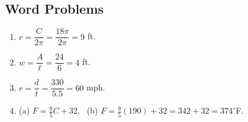 \documentclass[11pt]{article}
\begin{document}
\subsection*{Word Problems}
\begin{enumerate}[label=\arabic*.,leftmargin=2em,itemsep=2pt]
\item $r = \dfrac{C}{2\pi} = \dfrac{18\pi}{2\pi} = 9$ ft.
\item $w = \dfrac{A}{\ell} = \dfrac{24}{6} = 4$ ft.
\item $r = \dfrac{d}{t} = \dfrac{330}{5.5} = 60$ mph.
\item (a) $F = \tfrac{9}{5}C + 32$. \ (b) $F = \tfrac{9}{5}(190) + 32 = 342 + 32 = 374^\circ$F.
\end{enumerate}
\end{document}
